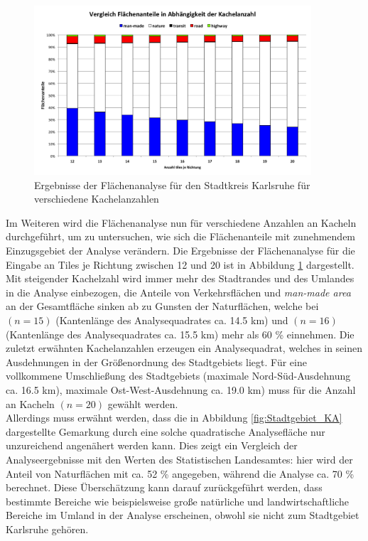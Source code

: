 \begin{figure}
  \centering
    \includegraphics[width=0.92\textwidth]{images/3_Kachelvergleich_KA.png}
    \caption{Ergebnisse der Flächenanalyse für den Stadtkreis Karlsruhe für verschiedene Kachelanzahlen}
    \label{fig:Kachel_vgl}
\end{figure}

Im Weiteren wird die Flächenanalyse nun für verschiedene Anzahlen an Kacheln durchgeführt, um zu untersuchen, wie sich die Flächenanteile mit zunehmendem Einzugsgebiet der Analyse verändern. Die Ergebnisse der Flächenanalyse für die Eingabe an Tiles je Richtung zwischen 12 und 20 ist in Abbildung \ref{fig:Kachel_vgl} dargestellt.\\
Mit steigender Kachelzahl wird immer mehr des Stadtrandes und des Umlandes in die Analyse einbezogen, die Anteile von Verkehrsflächen und \textit{man-made area} an der Gesamtfläche sinken ab zu Gunsten der Naturflächen, welche bei  \((n=15)\) (Kantenlänge des Analysequadrates ca. \num{14.5} \si{\kilo\metre}) und  \((n=16)\) (Kantenlänge des Analysequadrates ca. \num{15.5} \si{\kilo\metre}) mehr als \num{60} \% einnehmen. Die zuletzt erwähnten Kachelanzahlen erzeugen ein Analysequadrat, welches in seinen Ausdehnungen in der Größenordnung des Stadtgebiets liegt. Für eine vollkommene Umschließung des Stadtgebiets (maximale Nord-Süd-Ausdehnung ca. \num{16.5} \si{\kilo\metre}), maximale Ost-West-Ausdehnung ca. \num{19.0} \si{\kilo\metre}) muss für die Anzahl an Kacheln \((n=20)\) gewählt werden.\\

Allerdings muss erwähnt werden, dass die in Abbildung \ref{fig:Stadtgebiet_KA} dargestellte Gemarkung durch eine solche quadratische Analysefläche nur unzureichend angenähert werden kann. Dies zeigt ein Vergleich der Analyseergebnisse mit den Werten des Statistischen Landesamtes: hier wird der Anteil von Naturflächen mit ca. \num{52} \% angegeben, während die Analyse ca. \num{70} \% berechnet. Diese Überschätzung kann darauf zurückgeführt werden, dass bestimmte Bereiche wie beispielsweise große natürliche und landwirtschaftliche Bereiche im Umland in der Analyse erscheinen, obwohl sie nicht zum Stadtgebiet Karlsruhe gehören.\\


